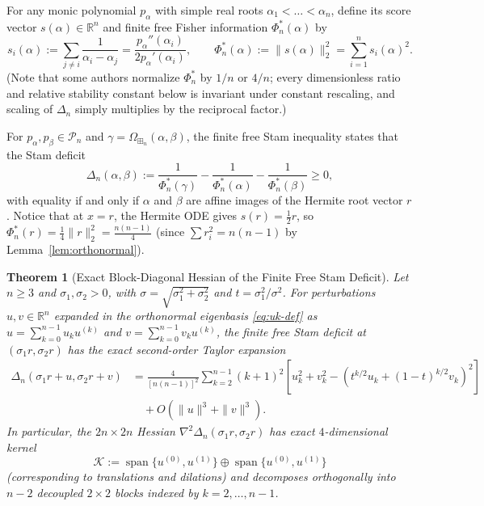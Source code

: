 \documentclass[11pt,a4paper]{article}
\newtheorem{theorem}{Theorem}[section]
\theoremstyle{definition}
\DeclareMathOperator{\Span}{span}
\newcommand{\R}{\mathbb{R}}
\newcommand{\boxplusn}{\boxplus_n}
\begin{document}
For any monic polynomial $p_\alpha$ with simple real roots $\alpha_1 < \dots < \alpha_n$, define its score vector $s(\alpha) \in \R^n$ and finite free Fisher information $\Phi_n^*(\alpha)$ by
\[
s_i(\alpha) := \sum_{j \neq i} \frac{1}{\alpha_i - \alpha_j} = \frac{p_\alpha''(\alpha_i)}{2 p_\alpha'(\alpha_i)}, \qquad \Phi_n^*(\alpha) := \|s(\alpha)\|_2^2 = \sum_{i=1}^n s_i(\alpha)^2.
\]
(Note that some authors normalize $\Phi_n^*$ by $1/n$ or $4/n$; every dimensionless ratio and relative stability constant below is invariant under constant rescaling, and scaling of $\Delta_n$ simply multiplies by the reciprocal factor.)

For $p_\alpha, p_\beta \in \mathcal{P}_n$ and $\gamma = \Omega_{\boxplusn}(\alpha, \beta)$, the finite free Stam inequality \cite{GSS2026} states that the Stam deficit
\[
\Delta_n(\alpha, \beta) := \frac{1}{\Phi_n^*(\gamma)} - \frac{1}{\Phi_n^*(\alpha)} - \frac{1}{\Phi_n^*(\beta)} \ge 0,
\]
with equality if and only if $\alpha$ and $\beta$ are affine images of the Hermite root vector $r$. Notice that at $x = r$, the Hermite ODE gives $s(r) = \frac{1}{2} r$, so $\Phi_n^*(r) = \frac{1}{4}\|r\|_2^2 = \frac{n(n-1)}{4}$ (since $\sum r_i^2 = n(n-1)$ by Lemma~\ref{lem:orthonormal}).

\begin{theorem}[Exact Block-Diagonal Hessian of the Finite Free Stam Deficit]
\label{thm:stam-hessian}
Let $n \ge 3$ and $\sigma_1, \sigma_2 > 0$, with $\sigma = \sqrt{\sigma_1^2 + \sigma_2^2}$ and $t = \sigma_1^2/\sigma^2$. For perturbations $u, v \in \R^n$ expanded in the orthonormal eigenbasis \eqref{eq:uk-def} as $u = \sum_{k=0}^{n-1} u_k u^{(k)}$ and $v = \sum_{k=0}^{n-1} v_k u^{(k)}$, the finite free Stam deficit at $(\sigma_1 r, \sigma_2 r)$ has the exact second-order Taylor expansion
\begin{equation}
\label{eq:stam-hessian}
\begin{aligned}
\Delta_n(\sigma_1 r + u, \sigma_2 r + v)
&= \frac{4}{[n(n-1)]^2} \sum_{k=2}^{n-1} (k+1)^2 \left[ u_k^2 + v_k^2 - \left(t^{k/2} u_k + (1-t)^{k/2} v_k\right)^2 \right] \\
&\quad + O(\|u\|^3 + \|v\|^3).
\end{aligned}
\end{equation}
In particular, the $2n \times 2n$ Hessian $\nabla^2 \Delta_n(\sigma_1 r, \sigma_2 r)$ has exact $4$-dimensional kernel
\[
\mathcal{K} := \Span\{u^{(0)}, u^{(1)}\} \oplus \Span\{u^{(0)}, u^{(1)}\}
\]
(corresponding to translations and dilations) and decomposes orthogonally into $n-2$ decoupled $2\times 2$ blocks indexed by $k = 2,\dots,n-1$.
\end{theorem}
\end{document}
